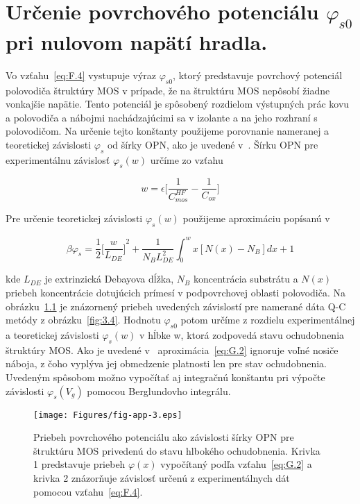 
\chapter{Určenie povrchového potenciálu $\varphi_{s0}$ pri nulovom napätí hradla.}\label{app:AppendixG}

Vo vzťahu~\ref{eq:F.4} vystupuje výraz $\varphi_{s0}$, ktorý
predstavuje povrchový potenciál polovodiča štruktúry MOS v prípade, že
na štruktúru MOS nepôsobí žiadne vonkajšie napätie.  Tento potenciál
je spôsobený rozdielom výstupných prác kovu a polovodiča a nábojmi
nachádzajúcimi sa v izolante a na jeho rozhraní s polovodičom. Na
určenie tejto konštanty použijeme porovnanie nameranej a teoretickej
závislosti $\varphi_{s}$ od šírky OPN, ako je uvedené
v~\cite{App.3}. Šírku OPN pre experimentálnu závislosť
$\varphi_{s}(w)$ určíme zo vzťahu

\begin{equation}\label{eq:G.1}
  w = \epsilon \bigg[\frac{1}{C_{mos}^{HF}} - \frac{1}{C_{ox}}\bigg]
\end{equation}

Pre určenie teoretickej závislosti $\varphi_{s}(w)$ použijeme
aproximáciu popísanú v~\cite{App.5}

\begin{equation}\label{eq:G.2}
  \beta \varphi_{s} = \frac{1}{2} {\bigg[\frac{w}{L_{DE}}\bigg]}^2 + \frac{1}{N_{B}L_{DE}^{2}} \int_{0}^{w}x[N(x)-N_{B}]dx + 1
\end{equation}

kde $L_{DE}$ je extrinzická Debayova dĺžka, $N_{B}$ koncentrácia
substrátu a $N(x)$ priebeh koncentrácie dotujúcich prímesí v
podpovrchovej oblasti polovodiča. Na obrázku~\ref{fig:App.3} je
znázornený priebeh uvedených závislostí pre namerané dáta Q-C metódy z
obrázku~\ref{fig:3.4}. Hodnotu $\varphi_{s0}$ potom určíme z rozdielu
experimentálnej a teoretickej závislosti $\varphi_{s}(w)$ v hĺbke w,
ktorá zodpovedá stavu ochudobnenia štruktúry MOS\@. Ako je uvedené
v~\cite{App.3} aproximácia~\ref{eq:G.2} ignoruje voľné nosiče náboja,
z čoho vyplýva jej obmedzenie platnosti len pre stav ochudobnenia.
Uvedeným spôsobom možno vypočítať aj integračnú konštantu pri výpočte
závislosti $\varphi_{s}(V_{g})$ pomocou Berglundovho integrálu.

\begin{figure}[h!]\centering
\texttt{[image: Figures/fig-app-3.eps]}
\caption[Priebeh povrchového potenciálu ako závislosti šírky OPN pre
  štruktúru MOS privedenú do stavu hlbokého ochudobnenia]{Priebeh
  povrchového potenciálu ako závislosti šírky OPN pre štruktúru MOS
  privedenú do stavu hlbokého ochudobnenia.  Krivka 1 predstavuje
  priebeh $\varphi(x)$ vypočítaný podľa vzťahu~\ref{eq:G.2} a krivka 2
  znázorňuje závislosť určenú z experimentálnych dát pomocou
  vzťahu~\ref{eq:F.4}.}\label{fig:App.3}
\end{figure}
